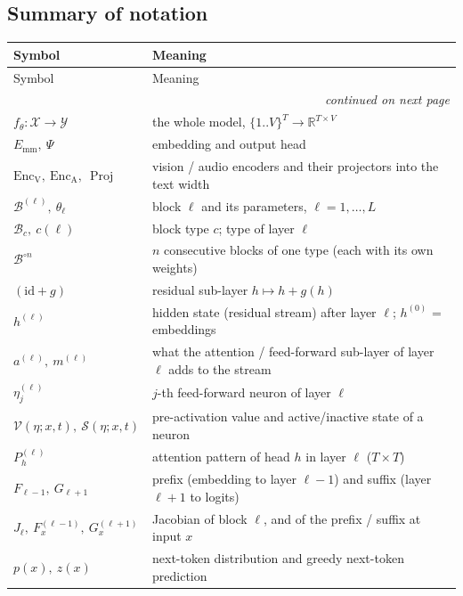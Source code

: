 \documentclass[10pt,a4paper]{article}
\newcommand{\op}[1]{\operatorname{#1}}
\theoremstyle{definition}
\begin{document}
\subsection{Summary of notation}
\begin{longtable}{l>{\raggedright\arraybackslash}p{10.5cm}}
\toprule
Symbol & Meaning \\
\midrule
\endfirsthead
\toprule
Symbol & Meaning \\
\midrule
\endhead
\midrule \multicolumn{2}{r}{\textit{continued on next page}} \\
\endfoot
\bottomrule
\endlastfoot
$f_\theta:\mathcal{X}\to\mathcal{Y}$ & the whole model, $\{1..V\}^T\to\mathbb{R}^{T\times V}$ \\
$E_{\mathrm{mm}},\ \Psi$ & embedding and output head \\
$\op{Enc_V},\ \op{Enc_A},\ \op{Proj}$ & vision / audio encoders and their projectors into the text width \\
$\mathcal{B}^{(\ell)},\ \theta_\ell$ & block $\ell$ and its parameters, $\ell=1,\dots,L$ \\
$\mathcal{B}_c,\ c(\ell)$ & block type $c$; type of layer $\ell$ \\
$\mathcal{B}^{\circ n}$ & $n$ consecutive blocks of one type (each with its own weights) \\
$(\mathrm{id}+g)$ & residual sub-layer $h\mapsto h+g(h)$ \\
$h^{(\ell)}$ & hidden state (residual stream) after layer $\ell$; $h^{(0)}$ = embeddings \\
$a^{(\ell)},\ m^{(\ell)}$ & what the attention / feed-forward sub-layer of layer $\ell$ adds to the stream \\
$\eta^{(\ell)}_j$ & $j$-th feed-forward neuron of layer $\ell$ \\
$\mathcal{V}(\eta;x,t),\ \mathcal{S}(\eta;x,t)$ & pre-activation value and active/inactive state of a neuron \\
$P^{(\ell)}_h$ & attention pattern of head $h$ in layer $\ell$ ($T\times T$) \\
$F_{\ell-1},\ G_{\ell+1}$ & prefix (embedding to layer $\ell-1$) and suffix (layer $\ell+1$ to logits) \\
$J_\ell,\ F^{(\ell-1)}_x,\ G^{(\ell+1)}_x$ & Jacobian of block $\ell$, and of the prefix / suffix at input $x$ \\
$p(x),\ z(x)$ & next-token distribution and greedy next-token prediction \\
\end{longtable}
\end{document}
